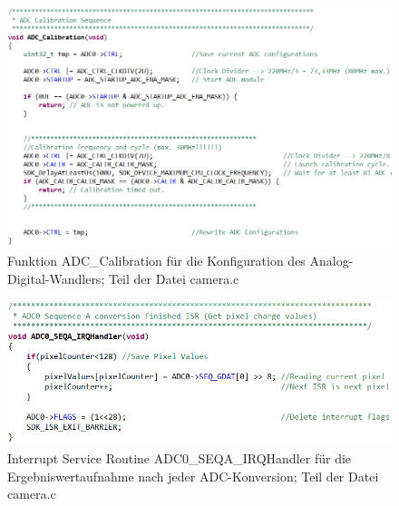\begin{figure}[H] %
\includegraphics[width=.95\textwidth]{sec7/images/code/ADCCalibration} 
\centering
\captionsetup{width=.95\textwidth}
\caption[Funktion \glqq{}ADC\_Calibration\grqq{} aus der Datei \glqq{}camera.c\grqq{}]{Funktion \glqq{}ADC\_Calibration\grqq{} für die Konfiguration des Analog-Digital-Wandlers; Teil der Datei \glqq{}camera.c\grqq{}}\centering
\label{fig:ADCCalibration}
\end{figure}


\begin{figure}[H] %
\includegraphics[width=.9\textwidth]{sec7/images/code/ADC0SEQAIRQHandler} 
\centering
\captionsetup{width=.95\textwidth}
\caption[Interrupt Service Routine \glqq{}ADC0\_SEQA\_IRQHandler\grqq{} aus der Datei \glqq{}camera.c\grqq{}]{Interrupt Service Routine \glqq{}ADC0\_SEQA\_IRQHandler\grqq{} für die Ergebniswertaufnahme nach jeder ADC-Konversion; Teil der Datei \glqq{}camera.c\grqq{}}\centering
\label{fig:ADC0SEQAIRGHandler}
\end{figure}

